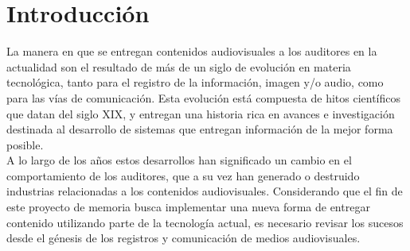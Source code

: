 \chapter{Introducción}

La manera en que se entregan contenidos audiovisuales a los auditores en la actualidad son el resultado de más de un siglo de evolución en materia tecnológica, tanto para el registro de la información, imagen y/o audio, como para las vías de comunicación. Esta evolución está compuesta de hitos científicos que datan del siglo XIX, y entregan una historia rica en avances e investigación destinada al desarrollo de sistemas que entregan información de la mejor forma posible.\\

A lo largo de los años estos desarrollos han significado un cambio en el comportamiento de los auditores, que a su vez han generado o destruido industrias relacionadas a los contenidos audiovisuales. Considerando que el fin de este proyecto de memoria busca implementar una nueva forma de entregar contenido utilizando parte de la tecnología actual, es necesario revisar los sucesos desde el génesis de los registros y comunicación de medios audiovisuales.





